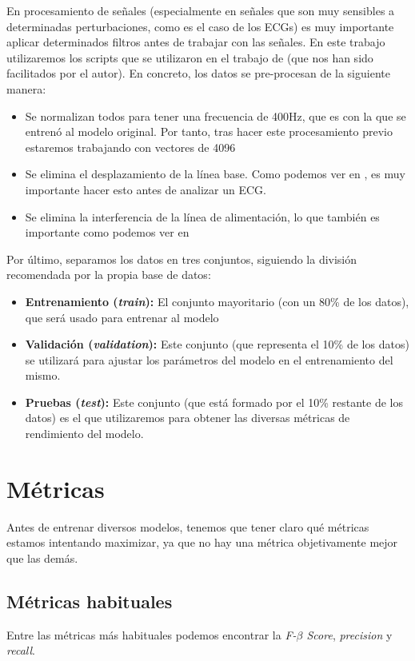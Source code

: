En procesamiento de señales (especialmente en señales que son muy sensibles a determinadas perturbaciones, como es el caso de los \ac{ECG}s) es muy importante aplicar determinados filtros antes de trabajar con las señales. En este trabajo utilizaremos los scripts que se utilizaron en el trabajo de \cite{TFGSergio} (que nos han sido facilitados por el autor). En concreto, los datos se pre-procesan de la siguiente manera:
\begin{itemize}
	\item Se normalizan todos para tener una frecuencia de 400Hz, que es con la que se entrenó al modelo original. Por tanto, tras hacer este procesamiento previo estaremos trabajando con vectores de 4096
	\item Se elimina el desplazamiento de la línea base. Como podemos ver en \cite{baseline}, es muy importante hacer esto antes de analizar un \ac{ECG}.
	\item Se elimina la interferencia de la línea de alimentación, lo que también es importante como podemos ver en \cite{powerline}
\end{itemize}

Por último, separamos los datos en tres conjuntos, siguiendo la división recomendada por la propia base de datos:
\begin{itemize}
	\item \textbf{Entrenamiento (\emph{train}):} El conjunto mayoritario (con un 80\% de los datos), que será usado para entrenar al modelo
	\item \textbf{Validación (\emph{validation}):} Este conjunto (que representa el 10\% de los datos) se utilizará para ajustar los parámetros del modelo en el entrenamiento del mismo.
	\item \textbf{Pruebas (\emph{test}):} Este conjunto (que está formado por el 10\% restante de los datos) es el que utilizaremos para obtener las diversas métricas de rendimiento del modelo.
\end{itemize}

\section{Métricas}
Antes de entrenar diversos modelos, tenemos que tener claro qué métricas estamos intentando maximizar, ya que no hay una métrica objetivamente mejor que las demás.

\subsection{Métricas habituales}
Entre las métricas más habituales podemos encontrar la \emph{F-$\beta$ Score}, \emph{precision} y \emph{recall}.

